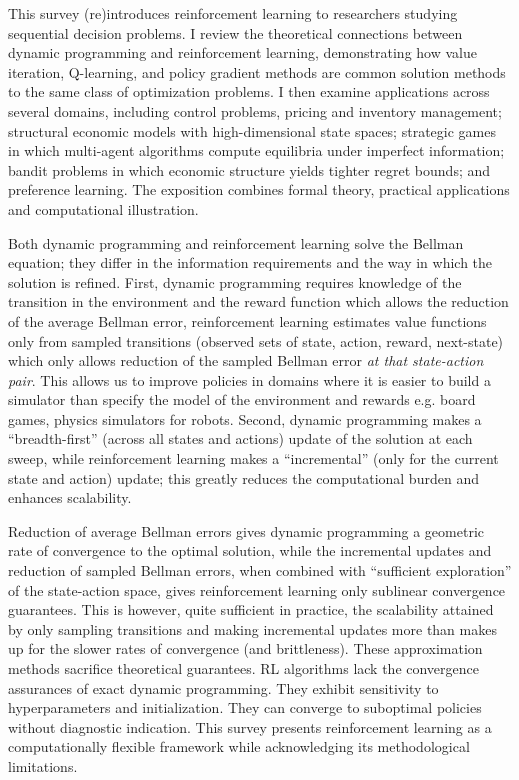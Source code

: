 This survey (re)introduces reinforcement learning to researchers studying sequential decision problems. I review the theoretical connections between dynamic programming and reinforcement learning, demonstrating how value iteration, Q-learning, and policy gradient methods are common solution methods to the same class of optimization problems. I then examine applications across several domains, including control problems, pricing and inventory management; structural economic models with high-dimensional state spaces; strategic games in which multi-agent algorithms compute equilibria under imperfect information; bandit problems in which economic structure yields tighter regret bounds; and preference learning. The exposition combines formal theory, practical applications and computational illustration.

Both dynamic programming and reinforcement learning solve the Bellman equation; they differ in the information requirements and the way in which the solution is refined. First, dynamic programming requires knowledge of the transition in the environment and the reward function which allows the reduction of the average Bellman error, reinforcement learning estimates value functions only from sampled transitions (observed sets of state, action, reward, next-state) which only allows reduction of the sampled Bellman error \textit{at that state-action pair}. This allows us to improve policies in domains where it is easier to build a simulator than specify the model of the environment and rewards e.g. board games, physics simulators for robots. Second, dynamic programming makes a ``breadth-first'' (across all states and actions) update of the solution at each sweep, while reinforcement learning makes a ``incremental'' (only for the current state and action) update; this greatly reduces the computational burden and enhances scalability.

Reduction of average Bellman errors gives dynamic programming a geometric rate of convergence to the optimal solution, while the incremental updates and reduction of sampled Bellman errors, when combined with ``sufficient exploration'' of the state-action space, gives reinforcement learning only sublinear convergence guarantees. This is however, quite sufficient in practice, the scalability attained by only sampling transitions and making incremental updates more than makes up for the slower rates of convergence (and brittleness). These approximation methods sacrifice theoretical guarantees. RL algorithms lack the convergence assurances of exact dynamic programming. They exhibit sensitivity to hyperparameters and initialization. They can converge to suboptimal policies without diagnostic indication. This survey presents reinforcement learning as a computationally flexible framework while acknowledging its methodological limitations.

